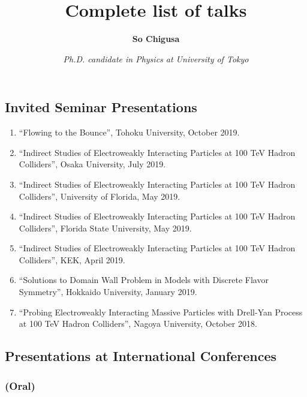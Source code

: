 \documentclass[12pt,notitlepage]{article}
\title{\vspace*{-3cm}Complete list of talks}
\author{\textbf{So Chigusa}}
\date{\vspace*{-4mm}\textit{Ph.D. candidate in Physics at University of Tokyo}}
\begin{document}
\maketitle

\subsection*{Invited Seminar Presentations}

\begin{enumerate}
  \item ``Flowing to the Bounce'', Tohoku University, October 2019.
  \item ``Indirect Studies of Electroweakly Interacting Particles at 100 TeV Hadron Colliders'', Osaka University, July 2019.
  \item ``Indirect Studies of Electroweakly Interacting Particles at 100 TeV Hadron Colliders'', University of Florida, May 2019.
  \item ``Indirect Studies of Electroweakly Interacting Particles at 100 TeV Hadron Colliders'', Florida State University, May 2019.
  \item ``Indirect Studies of Electroweakly Interacting Particles at 100 TeV Hadron Colliders'', KEK, April 2019.
  \item ``Solutions to Domain Wall Problem in Models with Discrete Flavor Symmetry'', Hokkaido University, January 2019.
  \item ``Probing Electroweakly Interacting Massive Particles with Drell-Yan Process at 100 TeV Hadron Colliders'', Nagoya University, October 2018.
\end{enumerate}

\subsection*{Presentations at International Conferences}

\subsubsection*{(Oral)}
\end{document}
